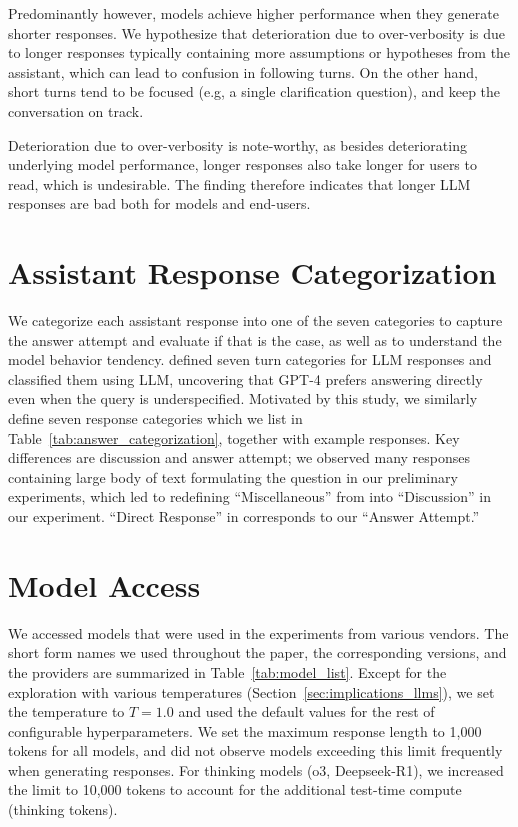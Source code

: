 \documentclass{article}
\begin{document}
\begin{appendices}
Predominantly however, models achieve higher performance when they generate shorter responses. We hypothesize that deterioration due to over-verbosity is due to longer responses typically containing more assumptions or hypotheses from the assistant, which can lead to confusion in following turns. On the other hand, short turns tend to be focused (e.g,  a single clarification question), and keep the conversation on track.

Deterioration due to over-verbosity is note-worthy, as besides deteriorating underlying model performance, longer responses also take longer for users to read, which is undesirable. The finding therefore indicates that longer LLM responses are bad both for models and end-users.

\section{Assistant Response Categorization} \label{app:answer_categorization}
We categorize each assistant response into one of the seven categories to capture the answer attempt and evaluate if that is the case, as well as to understand the model behavior tendency.
\citet{herlihy2024overcoming} defined seven turn categories for LLM responses and classified them using LLM, uncovering that GPT-4 prefers answering directly even when the query is underspecified.
Motivated by this study, we similarly define seven response categories which we list in Table~\ref{tab:answer_categorization}, together with example responses.
Key differences are discussion and answer attempt; we observed many responses containing large body of text formulating the question in our preliminary experiments, which led to redefining ``Miscellaneous'' from \citep{herlihy2024overcoming} into ``Discussion'' in our experiment.
``Direct Response'' in \citep{herlihy2024overcoming} corresponds to our ``Answer Attempt.''



\section{Model Access}\label{app:model_details}

We accessed models that were used in the experiments from various vendors. 
The short form names we used throughout the paper, the corresponding versions, and the providers are summarized in Table~\ref{tab:model_list}.
Except for the exploration with various temperatures (Section~\ref{sec:implications_llms}), we set the temperature to $T=1.0$ and used the default values for the rest of configurable hyperparameters. We set the maximum response length to 1,000 tokens for all models, and did not observe models exceeding this limit frequently when generating responses. For thinking models (o3, Deepseek-R1), we increased the limit to 10,000 tokens to account for the additional test-time compute (thinking tokens).


\end{appendices}
\end{document}
